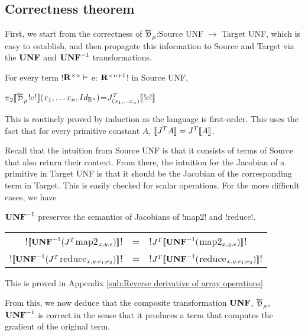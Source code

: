 \subsection{Correctness theorem} %
\label{sub:Correctness theorem}

First, we start from the correctness of $\Dsynrevsymbol_{\rho}$:Source UNF $\to$ Target UNF, which is easy to establish, 
and then propagate this information to Source and Target via the $\mathbf{UNF}$ and $\mathbf{UNF}^{-1}$ transformations.

\begin{proposition}
    For every term !$\mathbf{R}^{\times n} \vdash$ e: $\mathbf{R}^{\times n+1}$! in Source UNF,
    \begin{center}
        $\pi_2 \seml \Dsynrevsymbol_{\rho}$!e!$\rrbracket(x_1,\ldots x_n,Id_{\mathbb{R}^n})$=$J^T_{(x_1,\ldots x_n)}\llbracket$!e!$\rrbracket$
    \end{center} 
\end{proposition}

This is routinely proved by induction as the language is first-order. 
This uses the fact that for every primitive constant $A$, $\llbracket J^TA\rrbracket=J^T\llbracket A\rrbracket$.

Recall that the intuition from Source UNF is that it consists of terms of Source that also return their context.
From there, the intuition for the Jacobian of a primitive in Target UNF is that it should be the Jacobian of
the corresponding term in Target. This is easily checked for scalar operations. For the more difficult cases, we have 

\begin{proposition}
$\mathbf{UNF}^{-1}$ preserves the semantics of Jacobians of !map2! and !reduce!.
    \begin{center}
\begin{tabular}{r c l}
    !$\llbracket\mathbf{UNF}^{-1}(J^T$map2$_{x,y.e})\rrbracket$! &=& !$J^T\llbracket\mathbf{UNF}^{-1}($map2$_{x,y.e})\rrbracket$!\\
    !$\llbracket\mathbf{UNF}^{-1}(J^T$reduce$_{x,y.e_1;e_2})\rrbracket$! &=& !$J^T\llbracket\mathbf{UNF}^{-1}($reduce$_{x,y.e_1;e_2})\rrbracket$!
\end{tabular}
\end{center}
\end{proposition}

This is proved in Appendix \ref{sub:Reverse derivative of array operations}.

From this, we now deduce that the composite transformation $\mathbf{UNF}$, $\Dsynrevsymbol_{\rho}$, $\mathbf{UNF}^{-1}$ is correct
in the sense that it produces a term that computes the gradient of the original term.

